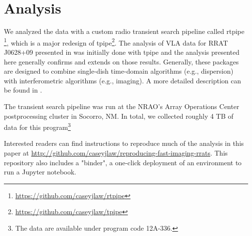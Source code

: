 \section{Analysis}

We analyzed the data with a custom radio transient search pipeline called rtpipe \footnote{\url{https://github.com/caseyjlaw/rtpipe}}, which is a major redesign of tpipe\footnote{\url{https://github.com/caseyjlaw/tpipe}}. The analysis of VLA data for RRAT J0628+09 presented in \citet{Law_2012} was initially done with tpipe and the analysis presented here generally confirms and extends on those results. Generally, these packages are designed to combine single-dish time-domain algorithms (e.g., dispersion) with interferometric
algorithms (e.g., imaging). A more detailed description can be found in \citet{2015ApJ...807...16L}.

The transient search pipeline was run at the NRAO's Array Operations Center postprocessing cluster in Socorro, NM. In total, we collected roughly 4 TB of data for this program\footnote{The data are available under program code 12A-336.}

Interested readers can find instructions to reproduce much of the analysis in this paper at \url{http://github.com/caseyjlaw/reproducing-fast-imaging-rrats}. This repository also includes a "binder", a one-click deployment of an environment to run a Jupyter notebook.
